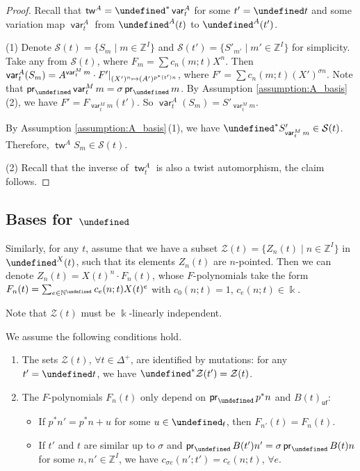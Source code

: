 \documentclass[10pt,a4paper]{amsart}
\newcommand{\kk}{\Bbbk}
\newcommand{\Z}{\mathbb{Z}}
\newcommand{\N}{\mathbb{N}}
\renewcommand{\tilde}[1]{\widetilde{#1}}
\newcommand{\opname}[1]{\operatorname{\mathsf{#1}}}
\newcommand{\pr}{\opname{pr}}
\newcommand{\cS}{{\mathcal S}}
\newcommand{\cZ}{{\mathcal Z}}
\newcommand{\tw}{{\tilde{w}}}
\newcommand{\var}{\opname{var}}
\newcommand{\fv}{\opname{f}}
\newcommand{\ufv}{\opname{uf}}
\let\Mc\undefined
\let\Iufv\undefined
\let\XClAlg\undefined
\let\LP\undefined
\let\seq\undefined
\renewcommand{\tw}{\opname{tw}}
\newcommand{\Mc}{M^\circ}
\newcommand{\Iufv}{I_{\ufv}}
\newcommand{\XClAlg}{\mathcal{U}^X}
\newcommand{\LP}{{\mathcal{LP}}}
\newcommand{\seq}{\boldsymbol{\mu}}%
\renewcommand{\tw}{\opname{tw}}
\numberwithin{equation}{section}
\begin{document}
\begin{proof}
Recall that $\tw^{A}=\seq^*\var_{t}^{A}$ for some $t'=\seq t$ and some variation map $\var_{t}^{A}$ from $\LP^A(t)$ to $\LP^A(t')$.

(1) Denote $\cS(t)=\big\{S_m\mid m\in \Z^I\big\}$ and $\cS(t')=\big\{S'_{m'}\mid m'\in \Z^I\big\}$ for simplicity. Take any  from $\cS(t)$, where $F_m =\sum c_n(m;t)X^n$. Then $\smash{\var_{t}^{A}(S_m)=A^{\var_t^M m} }\cdot \smash{F'|_{(X')^n\mapsto (A')^{p^*(t') n}}}$, where $F'=\sum c_{n}(m;t)(X')^{\sigma n}$. Note that $\pr_{\Iufv}\var_t^M m=\sigma \pr_{\Iufv}m$. By Assumption \ref{assumption:A_basis}\,(2), we have $F'=F_{\var_t^M m}(t')$. So $\var_{t}^{A}(S_m)=S'_{\var^M_t m}$.

By Assumption \ref{assumption:A_basis}\,(1), we have $\seq^* S'_{\var^M_t m}\in \cS(t)$. Therefore, $\tw^{A} S_m\in \cS(t)$.

(2) Recall that the inverse of $\tw_{t}^{A}$ is also a twist automorphism,
the claim follows.
\end{proof}

\subsection[Bases for U\^{}X]{Bases for $\boldsymbol{\XClAlg}$}

Similarly, for any $t$, assume that we have a subset $\cZ(t)=\big\{Z_{n}(t)\mid n\in \Z^I\big\}$
in $\LP^{X}(t)$, such that its elements $Z_{n}(t)$ are $n$-pointed.
Then we can denote $Z_{n}(t)=X(t)^{n}\cdot F_{n}(t)$, whose $F$-polynomials
take the form $F_{n}(t)=\sum_{e\in\N^{\Iufv}}c_{e}(n;t)X(t)^{e}$ with
$c_{0}(n;t)=1$, $c_{e}(n;t)\in\kk$.

Note that $\cZ(t)$ must be $\kk$-linearly independent.


\begin{Assumption}\label{assumption:X_basis}
 We assume the following conditions hold.
\begin{enumerate}\itemsep=0pt
\item[(1)] The sets $\cZ(t)$, $\forall t\in\Delta^{+}$, are identified by mutations: for any $t'=\seq t$, we have $\seq^{*}\cZ(t')=\cZ(t)$.
\item[(2)] The $F$-polynomials $F_{n}(t)$ only depend on $\pr_{\Iufv}p^{*}n$
and $B(t)_{\ufv}$:
\begin{itemize}\itemsep=0pt
\item If $p^{*}n'=p^{*}n+u$ for some $u\in\Mc_{\fv}$, then $F_{n'}(t)=F_{n}(t)$.
\item If $t'$ and $t$ are similar up to $\sigma$ and $\pr_{\Iufv}B(t')n'=\sigma\pr_{\Iufv}B(t)n$
for some $n,n'\in\Z^{I}$, we have $c_{\sigma e}(n';t')=c_{e}(n;t)$,
$\forall e$.
\end{itemize}
\end{enumerate}
\end{Assumption}
\end{document}
